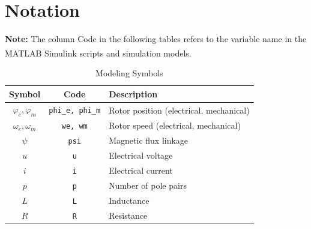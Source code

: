 \section*{Notation}
\textbf{Note:} The column Code in the following tables refers to the variable name in the MATLAB\textsuperscript{\textregistered} Simulink\textsuperscript{\textregistered} scripts and simulation models. \\

\begin{table}[H]
	\centering
	\caption{Modeling Symbols}
	\begin{tabular}{c|c|l}
		Symbol & Code & Description \\
		\hline
		$\varphi_e, \varphi_m$ & \verb|phi_e, phi_m| & Rotor position (electrical, mechanical) \\
		$\omega_e, \omega_m$ & \verb|we, wm| & Rotor speed (electrical, mechanical) \\
		$\psi$ & \verb|psi| & Magnetic flux linkage \\
		$u$ & \verb|u| & Electrical voltage \\
		$i$ & \verb|i| & Electrical current \\
		$p$ & \verb|p| & Number of pole pairs \\
		$L$ & \verb|L| & Inductance \\
		$R$ & \verb|R| & Resistance \\
	\end{tabular}
\end{table}



